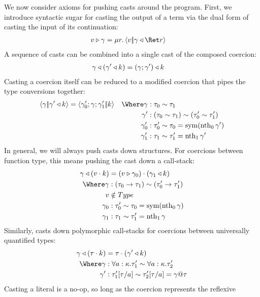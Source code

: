 \documentclass{article}
\begin{document}
We now consider axioms for pushing casts around the program.  First, we
introduce syntactic sugar for casting the output of a term via the dual form of
casting the input of its continuation:
\begin{align*}
  \coerce{\tm}{\cn} &= \comp{r}\cut{\tm}{\koerce{\cn}{\ret r}}
\end{align*}
A sequence of casts can be combined into a single cast of the composed coercion:
\begin{align*}
  {\gamma}\triangleleft{({\gamma'}\triangleleft{k})}
  &=
  {(\gamma; \gamma')}\triangleleft{k}
\end{align*}
Casting a coercion itself can be reduced to a modified coercion that pipes the
type conversions together:
\begin{align*}
  \cut{\cn}{\koerce{\cn'}{\ko}}
  &=
  \cut{\compcn{\cn'_0}{\compcn{\cn}{\cn'_1}}}{\ko}
  &
  \Where
  \cn &: \eqty{\ty_0}{\ty_1}
  \\ &&
  \cn' &: \eqty{(\eqty{\ty_0}{\ty_1})}{(\eqty{\ty'_0}{\ty'_1})}
  \\ &&
  \cn'_0 &: \eqty{\ty'_0}{\ty_0} = \sym(\nth_0 \cn')
  \\ &&
  \cn'_1 &: \eqty{\ty_1}{\ty'_1} = \nth_1 \cn'
\end{align*}
In general, we will always push casts down structures.  For coercions between
function type, this means pushing the cast down a call-stack:
\begin{align*}
  \koerce{\cn}{(\app{\tm}{\ko})}
  &=
  \app{(\coerce{\tm}{\cn_0})}{(\koerce{\cn_1}{\ko})}
  \\
  \Where
  \cn &: \eqty{(\ty_0 \to \ty_1)}{(\ty_0' \to \ty_1')}
  \\
  \tm &\notin Type
  \\
  \cn_0 &: \eqty{\ty'_0}{\ty_0} = \sym (\nth_0 \cn)
  \\
  \cn_1 &: \eqty{\ty_1}{\ty'_1} = \nth_1 \cn
\end{align*}
Similarly, casts down polymorphic call-stacks for coercions between universally
quantified types:
\begin{align*}
  \koerce{\cn}{(\app{\ty}{\ko})}
  &=
  \app{\ty}{(\koerce{\cn'}{\ko})}
  \\
  \Where
  \cn &: \eqty{\forall a:\ki. \ty'_1}{\forall a:\ki. \ty'_2}
  \\
  \cn' &: \eqty{\ty'_1\subst{a}{\ty}}{\ty'_2\subst{a}{\ty}} = \instancn{\cn}{\ty}
\end{align*}
Casting a literal is a no-op, so long as the coercion represents the reflexive
\end{document}
